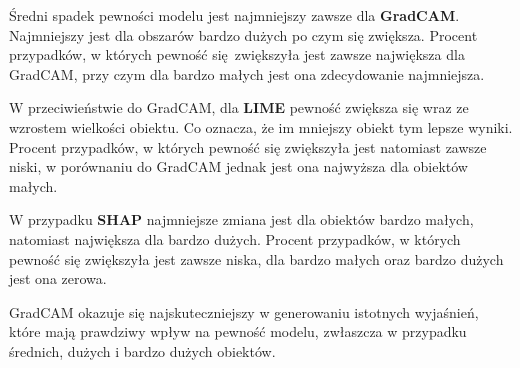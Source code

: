 Średni spadek pewności modelu jest najmniejszy zawsze dla \textbf{GradCAM}.
Najmniejszy jest dla obszarów bardzo dużych po czym się zwiększa.
Procent przypadków, w których pewność się zwiększyła jest zawsze największa dla GradCAM, przy czym dla bardzo małych jest ona zdecydowanie najmniejsza.

W przeciwieństwie do GradCAM, dla \textbf{LIME} pewność zwiększa się wraz ze wzrostem wielkości obiektu.
Co oznacza, że im mniejszy obiekt tym lepsze wyniki.
Procent przypadków, w których pewność się zwiększyła jest natomiast zawsze niski, w porównaniu do GradCAM jednak jest ona najwyższa dla obiektów małych.

W przypadku \textbf{SHAP} najmniejsze zmiana jest dla obiektów bardzo małych, natomiast największa dla bardzo dużych.
Procent przypadków, w których pewność się zwiększyła jest zawsze niska, dla bardzo małych oraz bardzo dużych jest ona zerowa.

GradCAM okazuje się najskuteczniejszy w generowaniu istotnych wyjaśnień, które mają prawdziwy wpływ na pewność modelu, zwłaszcza w przypadku średnich, dużych i bardzo dużych obiektów.

\vspace{1cm}

